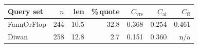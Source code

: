 \begin{tabular}{lrrrrrr}
\toprule
Query set & $n$ & len & \%\,quote & $C_{\mathrm{vrs}}$ & $C_{\mathrm{ai}}$ & $C_{\mathrm{ff}}$ \\
\midrule
FannOrFlop & 244 & 10.5 & 32.8 & 0.368 & 0.254 & 0.461 \\
Diwan & 258 & 12.8 & 2.7 & 0.151 & 0.360 & n/a \\
\bottomrule
\end{tabular}